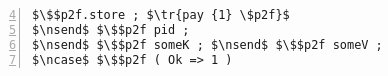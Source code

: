 \begin{lstlisting}[basicstyle=\scriptsize\BeraMonottFamily, frame=single, mathescape, numbers=left, xleftmargin=2em, xrightmargin=2em,firstnumber=4]
$\$$p2f.store ; $\tr{pay {1} \$p2f}$
$\nsend$ $\$$p2f pid ; 
$\nsend$ $\$$p2f someK ; $\nsend$ $\$$p2f someV ;
$\ncase$ $\$$p2f ( Ok => 1 )
\end{lstlisting}

%
%

